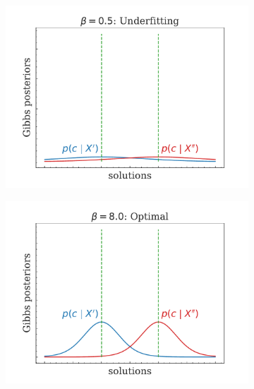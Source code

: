 \begin{figure}[H]
    \centering
    \begin{subfigure}[b]{0.3\textwidth}
        \centering
        \includegraphics[width=\textwidth]{img/theoretical_background/method_beta=0.5.pdf}
    \end{subfigure}
    \hfill
    \begin{subfigure}[b]{0.3\textwidth}
        \centering
        \includegraphics[width=\textwidth]{img/theoretical_background/method_beta=8.0.pdf}
    \end{subfigure}
    \hfill
    \begin{subfigure}[b]{0.3\textwidth}
        \centering

\end{subfigure}
\end{figure}
